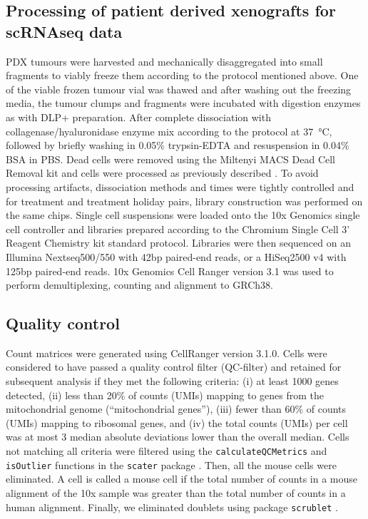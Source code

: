 \subsection{Processing of patient derived xenografts for scRNAseq data}
PDX tumours were harvested and mechanically disaggregated into small fragments to viably freeze them according to the protocol mentioned above. 
One of the viable frozen tumour vial was thawed and after washing out the freezing media, the tumour clumps and fragments were incubated with digestion enzymes as with DLP+ preparation. After complete dissociation with collagenase/hyaluronidase enzyme mix according to the protocol at \SI{37}{\degreeCelsius}, followed by briefly washing in 0.05\% trypsin-EDTA and resuspension in 0.04\% BSA in PBS. Dead cells were removed using the Miltenyi MACS Dead Cell Removal kit and cells were processed as previously described \cite{o2019dissociation}.
To avoid processing artifacts, dissociation methods and times were tightly controlled and for treatment and treatment holiday pairs, library construction was performed on the same chips. Single cell suspensions were loaded onto the 10x Genomics single cell controller and libraries prepared according to the Chromium Single Cell 3’ Reagent Chemistry kit standard protocol. 
Libraries were then sequenced on an Illumina Nextseq500/550 with 42bp paired-end reads, or a HiSeq2500 v4 with 125bp paired-end reads. 10x Genomics Cell Ranger version 3.1 was used to perform demultiplexing,  counting and alignment to GRCh38.

\subsection{Quality control}

Count matrices were generated using CellRanger version 3.1.0. Cells were considered to have passed a quality control filter (QC-filter) and retained for subsequent analysis if they met the following criteria: (i) at least 1000 genes detected, (ii) less than 20\% of counts (UMIs) mapping to genes from the mitochondrial genome (``mitochondrial genes''), (iii) fewer than 60\% of counts (UMIs) mapping to ribosomal genes, and (iv) the total counts (UMIs) per cell was at most 3 median absolute deviations lower than the overall median. Cells not matching all criteria were filtered using the \texttt{calculateQCMetrics} and \texttt{isOutlier} functions in the \texttt{scater} package \cite{mccarthy2017scater}. Then, all the mouse cells were eliminated. A cell is called a mouse cell if the total number of counts in a mouse alignment of the 10x sample was greater than the total number of counts in a human alignment. Finally, we eliminated doublets using package \texttt{scrublet} \cite{scrublet}.

